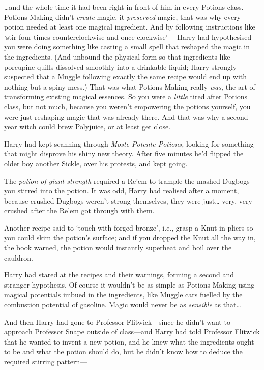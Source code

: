 \ldots{}and the whole time it had been right in front of him in every
Potions class. Potions-Making didn't \emph{create} magic, it
\emph{preserved} magic, that was why every potion needed at least one
magical ingredient. And by following instructions like `stir four times
counterclockwise and once clockwise' ---Harry had hypothesised---you
were doing something like casting a small spell that reshaped the magic
in the ingredients. (And unbound the physical form so that ingredients
like porcupine quills dissolved smoothly into a drinkable liquid; Harry
strongly suspected that a Muggle following exactly the same recipe would
end up with nothing but a spiny mess.) That was what Potions-Making
really \emph{was,} the art of transforming existing magical essences. So
you were a \emph{little} tired after Potions class, but not much,
because you weren't empowering the potions yourself, you were just
reshaping magic that was already there. And that was why a second-year
witch could brew Polyjuice, or at least get close.

Harry had kept scanning through \emph{Moste Potente Potions,} looking
for something that might disprove his shiny new theory. After five
minutes he'd flipped the older boy another Sickle, over his protests,
and kept going.

The \emph{potion of giant strength} required a Re'em to trample the
mashed Dugbogs you stirred into the potion. It was odd, Harry had
realised after a moment, because crushed Dugbogs weren't strong
themselves, they were just\ldots{} very, very crushed after the Re'em
got through with them.

Another recipe said to `touch with forged bronze', i.e., grasp a Knut in
pliers so you could skim the potion's surface; and if you dropped the
Knut all the way in, the book warned, the potion would instantly
superheat and boil over the cauldron.

Harry had stared at the recipes and their warnings, forming a second and
stranger hypothesis. Of course it wouldn't be as simple as
Potions-Making using magical potentials imbued in the ingredients, like
Muggle cars fuelled by the combustion potential of gasoline. Magic would
never be as \emph{sensible} as that\ldots{}

And then Harry had gone to Professor Flitwick---since he didn't want to
approach Professor Snape outside of class---and Harry had told Professor
Flitwick that he wanted to invent a new potion, and he knew what the
ingredients ought to be and what the potion should do, but he didn't
know how to deduce the required stirring pattern---

